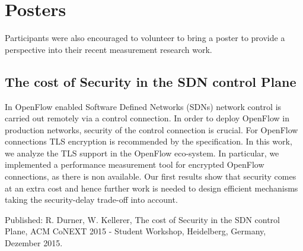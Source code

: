 \section{Posters}\label{sec:posters}

Participants were also encouraged to volunteer to bring a poster to provide a
perspective into their recent measurement research work.

\subsection{The cost of Security in the SDN control Plane}

In OpenFlow enabled Software Defined Networks (SDNs) network control is
carried out remotely via a control connection. In order to deploy OpenFlow in
production networks, security of the control connection is crucial. For
OpenFlow connections TLS encryption is recommended by the specification. In
this work, we analyze the TLS support in the OpenFlow eco-system. In
particular, we implemented a performance measurement tool for encrypted
OpenFlow connections, as there is non available.  Our first results show that
security comes at an extra cost and hence further work is needed to design
efficient mechanisms taking the security-delay trade-off into account.

Published: R. Durner, W. Kellerer, The cost of Security in the SDN control
Plane, ACM CoNEXT 2015 - Student Workshop, Heidelberg, Germany, Dezember 2015.

